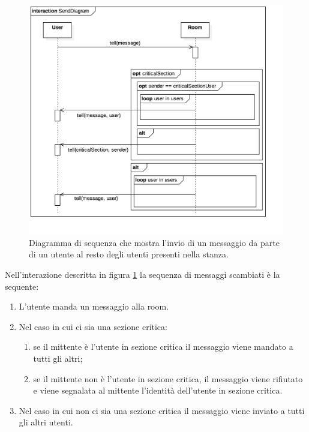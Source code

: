 \documentclass[a4paper]{report}
\begin{document}
\begin{figure}[H]
    \centering
    \includegraphics[width=\linewidth, height=\textheight, keepaspectratio]{res/SendDiagram}
        \caption{Diagramma di sequenza che mostra l'invio di un messaggio da parte di un utente al resto degli utenti presenti nella stanza.}
    \label{fig:send-diagram}
\end{figure}

Nell'interazione descritta in figura \ref{fig:send-diagram} la sequenza di messaggi scambiati è la sequente:
\begin{enumerate}[label=(\arabic*)]
%
    \item L'utente manda un messaggio alla room.
%
    \item Nel caso in cui ci sia una sezione critica:
        \begin{enumerate}
            \item se il mittente è l'utente in sezione critica il messaggio viene mandato a tutti gli altri;
%
            \item se il mittente non è l'utente in sezione critica, il messaggio viene rifiutato e viene segnalata al mittente l'identità dell'utente in sezione critica.
%
        \end{enumerate}
%
    \item Nel caso in cui non ci sia una sezione critica il messaggio viene inviato a tutti gli altri utenti.
\end{enumerate}
\end{document}
